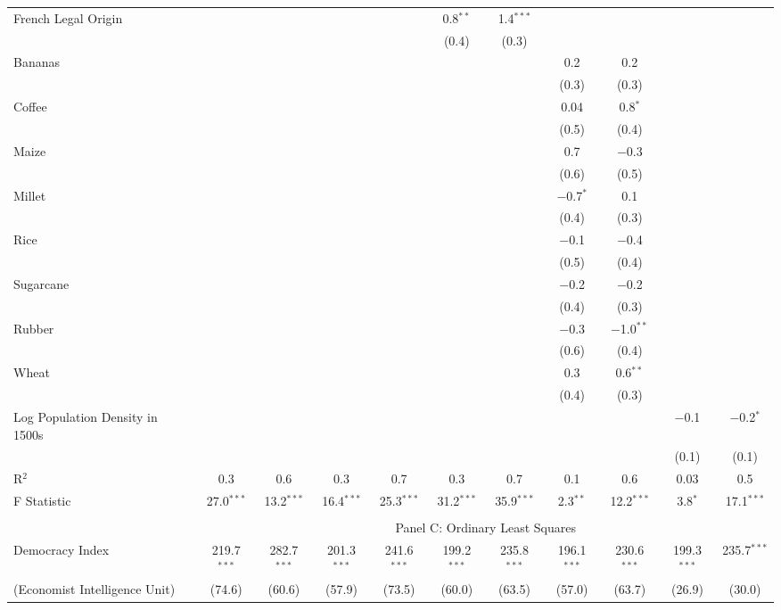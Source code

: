 \begin{table}[!htbp]
\begin{threeparttable}
\begin{tabular}{@{\extracolsep{0pt}}lcccccccccc}
  French Legal Origin &  &  &  &  & 0.8$^{**}$ & 1.4$^{***}$ &  &  &  &  \\ 
  &  &  &  &  & (0.4) & (0.3) &  &  &  &  \\ 
  Bananas &  &  &  &  &  &  & 0.2 & 0.2 &  &  \\ 
  &  &  &  &  &  &  & (0.3) & (0.3) &  &  \\ 
  Coffee &  &  &  &  &  &  & 0.04 & 0.8$^{*}$ &  &  \\ 
  &  &  &  &  &  &  & (0.5) & (0.4) &  &  \\ 
  Maize &  &  &  &  &  &  & 0.7 & $-$0.3 &  &  \\ 
  &  &  &  &  &  &  & (0.6) & (0.5) &  &  \\ 
  Millet &  &  &  &  &  &  & $-$0.7$^{*}$ & 0.1 &  &  \\ 
  &  &  &  &  &  &  & (0.4) & (0.3) &  &  \\ 
  Rice &  &  &  &  &  &  & $-$0.1 & $-$0.4 &  &  \\ 
  &  &  &  &  &  &  & (0.5) & (0.4) &  &  \\ 
  Sugarcane &  &  &  &  &  &  & $-$0.2 & $-$0.2 &  &  \\ 
  &  &  &  &  &  &  & (0.4) & (0.3) &  &  \\ 
  Rubber &  &  &  &  &  &  & $-$0.3 & $-$1.0$^{**}$ &  &  \\ 
  &  &  &  &  &  &  & (0.6) & (0.4) &  &  \\ 
  Wheat &  &  &  &  &  &  & 0.3 & 0.6$^{**}$ &  &  \\ 
  &  &  &  &  &  &  & (0.4) & (0.3) &  &  \\ 
  Log Population Density in 1500s &  &  &  &  &  &  &  &  & $-$0.1 & $-$0.2$^{*}$ \\ 
  &  &  &  &  &  &  &  &  & (0.1) & (0.1) \\ 
R$^{2}$ & 0.3 & 0.6 & 0.3 & 0.7 & 0.3 & 0.7 & 0.1 & 0.6 & 0.03 & 0.5 \\ 
F Statistic & 27.0$^{***}$ & 13.2$^{***}$ & 16.4$^{***}$ & 25.3$^{***}$ & 31.2$^{***}$ & 35.9$^{***}$ & 2.3$^{**}$ & 12.2$^{***}$ & 3.8$^{*}$ & 17.1$^{***}$ \\ 
\hline \\[-1.8ex] 
  & \multicolumn{10}{c}{Panel C: Ordinary Least Squares} \\
  Democracy Index & 219.7$^{***}$ & 282.7$^{***}$ & 201.3$^{***}$ & 241.6$^{***}$ & 199.2$^{***}$ & 235.8$^{***}$ & 196.1$^{***}$ & 230.6$^{***}$ & 199.3$^{***}$ & 235.7$^{***}$ \\ 
  (Economist Intelligence Unit)& (74.6) & (60.6) & (57.9) & (73.5) & (60.0) & (63.5) & (57.0) & (63.7) & (26.9) & (30.0) \\ 

\end{tabular}
\end{threeparttable}
\end{table}
